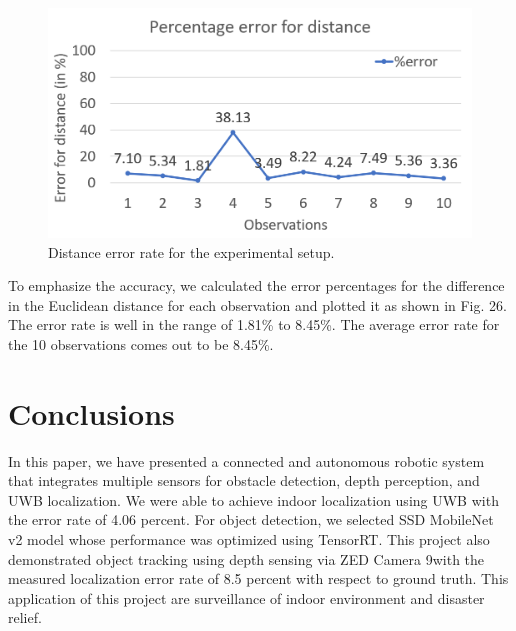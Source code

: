 \documentclass{IEEEtran}
\begin{document}
\begin{figure}[htb]
\centering
\includegraphics[width=1\linewidth]{fig/error_trace_percent.png}
\caption{Distance error rate for the experimental setup.} \label{fig.structure}
\end{figure}

To emphasize the accuracy, we calculated the error percentages for the difference in the Euclidean distance for each observation and plotted it as shown in Fig. 26. The error rate is well in the range of 1.81{\%} to 8.45{\%}. The average error rate for the 10 observations comes out to be 8.45{\%}.


\section{Conclusions}\label{sec:conclusions}
In this paper, we have presented a connected and autonomous robotic system that integrates multiple sensors for obstacle detection, depth perception, and UWB localization. We were able to achieve indoor localization using UWB with the error rate of 4.06 percent. For object detection, we selected SSD MobileNet v2 model whose performance was optimized using TensorRT. This project also demonstrated object tracking using depth sensing via ZED Camera 9with the measured localization error rate of 8.5 percent with respect to ground truth. This application of this project are surveillance of indoor environment and disaster relief.




\end{document}
